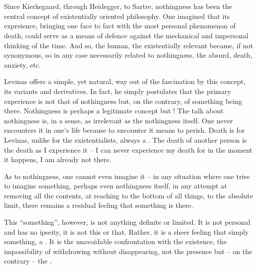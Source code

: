 \section{}
Since Kierkegaard, through Heidegger, to Sartre, nothingness has been the central concept
of existentially oriented philosophy. One imagined that its expreience, bringing one face to
fact with the most personal phenomenon of death, could serve as a means of defence against 
the mechanical and impersonal thinking of the time. And so, the human, the existentially 
relevant became, if not synonymous, so in any case necessarily related to nothingness, the 
absurd, death, anxiety, etc.

Levinas offers a simple, yet natural, way out of the fascination by this concept, its
variants and derivatives. In fact, he simply postulates that the primary experience is not
that of nothingness but, on the contrary, of something being there. 
%
Nothingness is perhaps a legitimate concept but ! The talk about nothingness is, in a sense, as
irrelevant as the nothingness itself. One never encounters it in one's life because
to encounter it means to perish. Death is for Levinas, unlike for the existentialists,
always a . The death of another person is the death as I 
experience it -- 
I can never experience my death for in the moment it happens, I am already not there.

As to nothingness, one cannot even imagine it -- in any situation where
one tries to imagine something, perhaps even nothingness itself,  in any attempt at 
removing all the contents, at 
reaching to the bottom of all things, to the absolute limit, there remains a residual
feeling that something is there. 

This ``something'', however, is not anything definite or limited. 
It is not personal and has no ipseity, it is not this or that. Rather, it is 
a sheer feeling that simply  something, a .
It is the unavoidable confrontation with the existence, the impossibility of withdrawing 
without disappearing, not the presence but -- on the contrary -- the .

